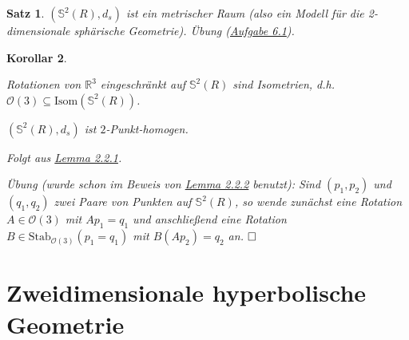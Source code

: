 \documentclass[11pt]{book}
\numberwithin{dummy}{section}
\newtheorem{theorem}{Satz}[section]
\newtheorem{corollary}[theorem]{Korollar}
\theoremstyle{nonumberbreak}
\newenvironment{pr}[1][]{\ifthenelse{\equal{#1}{}}{\proof}{\proof[#1]}\rm}{\endproof}
\newcommand{\R}{\mathbb{R}}
\newcommand{\Sph}{\mathbb{S}}
\begin{document}
\begin{spacing}{1.4}
\hypertarget{satzzweizweidrei}{}
\begin{theorem}    %
$(\Sph^2(R), d_s)$ ist ein metrischer Raum (also ein Modell für die 2-dimensionale sphärische Geometrie).
\begin{pr}
Übung
 (\hyperlink{Asechseins}{Aufgabe 6.1}).
\end{pr}
\end{theorem}


\begin{corollary}
\begin{compactenum}
\item Rotationen von $\R^3$ eingeschränkt auf $\Sph^2(R)$ sind Isometrien, d.h. $\mathcal{O}(3) \subseteq \mathrm{Isom}(\Sph^2(R))$.
\item $(\Sph^2(R), d_s)$ ist $2$-Punkt-homogen.
\end{compactenum}
\begin{pr}
\begin{compactenum}
\item Folgt aus \hyperlink{lemmazweizweieins}{Lemma 2.2.1}.
\item Übung (wurde schon im Beweis von \hyperlink{lemmazweizweizwei}{Lemma 2.2.2} benutzt): Sind $(p_1, p_2)$ und $(q_1, q_2)$ zwei Paare von Punkten auf $\Sph^2(R)$, so wende zunächst eine Rotation $A \in \mathcal{O}(3)$ mit $Ap_1 = q_1$ und anschließend eine Rotation $B \in \mathrm{Stab}_{\mathcal{O}(3)}(p_1=q_1)$ mit $B (Ap_2) = q_2$ an. $\hfill \Box$
\end{compactenum}
\end{pr}
\end{corollary}






\section{Zweidimensionale hyperbolische Geometrie} %



\end{spacing}
\end{document}
